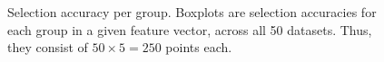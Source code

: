 \documentclass[11pt]{article}
\begin{document}
\begin{figure}[H]
	\centering
	\caption{Selection accuracy per group. Boxplots are selection accuracies for each group in a given feature vector, across all 50 datasets. Thus, they consist of $50\times 5 = 250$ points each.}
	\label{fig:exp2-sel-per-group}
\end{figure}
\end{document}
